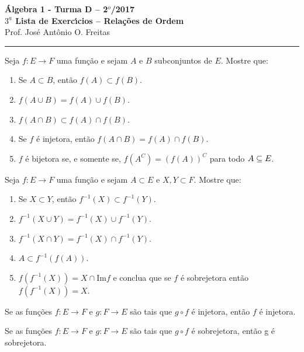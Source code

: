 \documentclass[12pt]{article}
\begin{document}


\begin{center}
{\Large\bf {\'A}lgebra 1 - Turma D -- 2$^{o}$/2017} \\ \vspace{9pt} {\large\bf
  $3^{\underline{a}}$ Lista de Exerc{\'\i}cios -- Rela\c{c}\~oes de Ordem}\\
\vspace{9pt} Prof. Jos{\'e} Ant{\^o}nio O. Freitas
\end{center}
\hrule

\vspace{.6cm}

\questao Seja $f:E\to F$ uma fun{\c c}{\~a}o e sejam $A$ e $B$ subconjuntos de $E$. Mostre que:
\begin{enumerate}[label={\alph*})]
\item Se $A\subset B$, ent{\~a}o $f(A)\subset f(B)$.
\item $f(A\cup B)=f(A)\cup f(B)$.
\item $f(A\cap B)\subset f(A)\cap f(B)$.
\item Se $f$ {\'e} injetora, ent{\~a}o $f(A\cap B) =  f(A)\cap f(B)$.
\item $f$ {\'e} bijetora se, e somente se, $f(A^C) = (f(A))^C$ para todo $A \subseteq E$.
\end{enumerate}

\vesp

\questao Seja $f:E\to F$ uma fun{\c c}{\~a}o e sejam $A\subset
E$ e $X, Y\subset F$. Mostre que:
\begin{enumerate}[label={\alph*})]
\item Se $X\subset Y$, ent{\~a}o $f^{-1}(X)\subset f^{-1}(Y)$.
\item $f^{-1}(X\cup Y)=f^{-1}(X)\cup f^{-1}(Y)$.
\item $f^{-1}(X\cap Y)= f^{-1}(X)\cap f^{-1}(Y)$.
\item $A\subset f^{-1}(f(A))$.
\item $f(f^{-1}(X))= X \cap \mbox{Im}f$ e conclua que se $f$ {\'e} sobrejetora ent{\~a}o
$f(f^{-1}(X))=X$.
\end{enumerate}

\vesp

\questao Se as fun{\c c}{\~o}es $f:E\to F$ e $g: F\to E$ s{\~a}o
tais que $g\circ f$ {\'e} injetora, ent{\~a}o $f$ {\'e} injetora.

\vesp

\questao Se as fun{\c c}{\~o}es $f:E\to F$ e $g: F\to E$ s{\~a}o
tais que $g\circ f$ {\'e} sobrejetora, ent{\~a}o g {\'e} sobrejetora.
\end{document}
